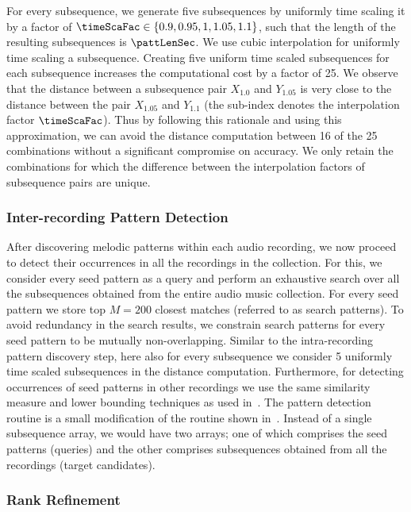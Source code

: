 For every subsequence, we generate five subsequences by uniformly time scaling it by a factor of $\timeScaFac \in \lbrace 0.9, 0.95, 1, 1.05, 1.1\rbrace$, such that the length of the resulting subsequences is $\pattLenSec$. We use cubic interpolation for uniformly time scaling a subsequence. Creating five uniform time scaled subsequences for each subsequence increases the computational cost by a factor of 25. We observe that the distance between a subsequence pair $X_{1.0}$ and $Y_{1.05}$ is very close to the distance between the pair $X_{1.05}$ and $Y_{1.1}$ (the sub-index denotes the interpolation factor $\timeScaFac$). Thus by following this rationale and using this approximation, we can avoid the distance computation between 16 of the 25 combinations without a significant compromise on accuracy. We only retain the combinations for which the difference between the interpolation factors of subsequence pairs are unique. 

\subsubsection{Inter-recording Pattern Detection}
\label{sec:inter_recording_pattern_search}

After discovering melodic patterns within each audio recording, we now proceed to detect their occurrences in all the recordings in the collection. For this, we consider every seed pattern as a query and perform an exhaustive search over all the subsequences obtained from the entire audio music collection. For every seed pattern we store top $M=200$ closest matches (referred to as search patterns). To avoid redundancy in the search results, we constrain search patterns for every seed pattern to be mutually non-overlapping. Similar to the intra-recording pattern discovery step, here also for every subsequence we consider 5 uniformly  time scaled subsequences in the distance computation. Furthermore, for detecting occurrences of seed patterns in other recordings we use the same similarity measure and lower bounding techniques as used in~. The pattern detection routine is a small modification of the routine shown in~. Instead of a single subsequence array, we would have two arrays; one of which comprises the seed patterns (queries) and the other comprises subsequences obtained from all the recordings (target candidates). 

\subsubsection{Rank Refinement}
\label{sec:rankRefinement}

